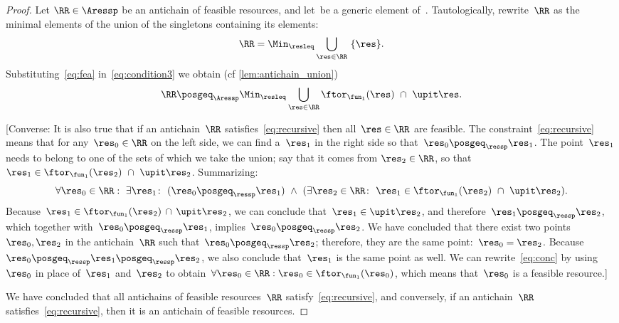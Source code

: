\begin{proof}
    Let $\RR\in\Aressp$ be an antichain of feasible resources, and
    let~\res be a generic element of~\ressp. Tautologically, rewrite~$\RR$
    as the minimal elements of the union of the singletons containing
    its elements:
    \begin{equation}
        \RR=\Min_{\resleq}\bigcup_{\res\in\RR}\ \{\res\}.\label{eq:condition3}
    \end{equation}
    Substituting~\cref{eq:fea} in~\cref{eq:condition3} we obtain (cf
    \cref{lem:antichain_union})
    \begin{equation}
        \RR\posgeq_{\Aressp}\Min_{\resleq}\bigcup_{\res\in\RR}\ftor_{\fun_{1}}(\res)\ \cap\ \upit\res.\label{eq:recursive}
    \end{equation}
    
    {[}Converse: It is also true that if an antichain~$\RR$ satisfies~\cref{eq:recursive}
    then all~$\res\in\RR$ are feasible. The constraint~\cref{eq:recursive}
    means that for any~$\res_{0}\in\RR$ on the left side, we can find
    a~$\res_{1}$ in the right side so that~$\res_{0}\posgeq_{\ressp}\res_{1}$.
    The point~$\res_{1}$ needs to belong to one of the sets of which
    we take the union; say that it comes from $\res_{2}\in\RR$, so
    that $\res_{1}\in\ftor_{\fun_{1}}(\res_{2})\ \cap\ \upit\res_{2}$.
    Summarizing:
        {
        \begin{equation}
            \forall\res_{0}\in\RR:\ \exists\res_{1}\colon\ (\res_{0}\posgeq_{\ressp}\res_{1})\ \wedge\ (\exists\res_{2}\in\RR\colon\ \res_{1}\in\ftor_{\fun_{1}}(\res_{2})\ \cap\ \upit\res_{2}).\label{eq:conc}
        \end{equation}
    }Because~$\res_{1}\in\ftor_{\fun_{1}}(\res_{2})\,\cap\,\upit\res_{2}$,
    we can conclude that~$\res_{1}\in\upit\res_{2}$, and therefore~$\res_{1}\posgeq_{\ressp}\res_{2}$,
    which together with~$\res_{0}\posgeq_{\ressp}\res_{1}$, implies~$\res_{0}\posgeq_{\ressp}\res_{2}$.
    We have concluded that there exist two points~$\res_{0},\res_{2}$
    in the antichain~$\RR$ such that~$\res_{0}\posgeq_{\ressp}\res_{2}$;
    therefore, they are the same point:~$\res_{0}=\res_{2}$. Because~$\res_{0}\posgeq_{\ressp}\res_{1}\posgeq_{\ressp}\res_{2}$,
    we also conclude that~$\res_{1}$ is the same point as well. We can
    rewrite~\cref{eq:conc} by using~$\res_{0}$ in place of~$\res_{1}$
    and~$\res_{2}$ to obtain~$\forall\res_{0}\in\RR:\res_{0}\in\ftor_{\fun_{1}}(\res_{0})$,
    which means that~$\res_{0}$ is a feasible resource.{]}
    
    We have concluded that all antichains of feasible resources~$\RR$
    satisfy~\cref{eq:recursive}, and conversely, if an antichain~$\RR$
    satisfies~\cref{eq:recursive}, then it is an antichain of feasible
    resources.
    

\end{proof}
